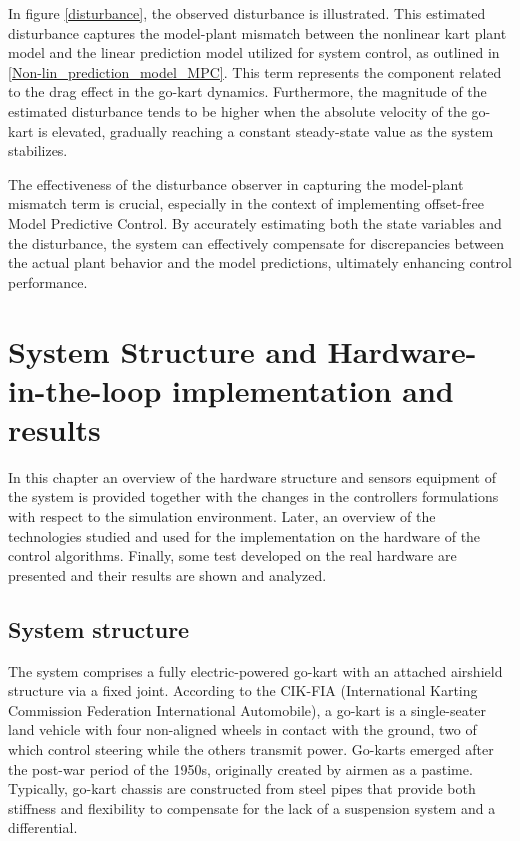 \documentclass[a4paper,12pt,oneside]{book}
\begin{document}
In figure \ref{disturbance}, the observed disturbance is illustrated. 
This estimated disturbance captures the model-plant mismatch between the nonlinear kart plant model and the linear prediction model utilized for system control, as outlined in \eqref{Non-lin_prediction_model_MPC}.
This term represents the component related to the drag effect in the go-kart dynamics.
Furthermore, the magnitude of the estimated disturbance tends to be higher when the absolute velocity of the go-kart is elevated, gradually reaching a constant steady-state value as the system stabilizes.

The effectiveness of the disturbance observer in capturing the model-plant mismatch term is crucial, especially in the context of implementing offset-free Model Predictive Control. 
By accurately estimating both the state variables and the disturbance, the system can effectively compensate for discrepancies between the actual plant behavior and the model predictions, ultimately enhancing control performance.

 \chapter{System Structure and Hardware-in-the-loop implementation and results}
In this chapter an overview of the hardware structure and sensors equipment of the system is provided together with the changes in the controllers formulations with respect to the simulation environment. 
Later, an overview of the technologies studied and used for the implementation on the hardware of the control algorithms.
Finally, some test developed on the real hardware are presented and their results are shown and analyzed.

\section{System structure}

The system comprises a fully electric-powered go-kart with an attached airshield structure via a fixed joint. 
According to the CIK-FIA (International Karting Commission Federation International Automobile), a go-kart is a single-seater land vehicle with four non-aligned wheels in contact with the ground, two of which control steering while the others transmit power. 
Go-karts emerged after the post-war period of the 1950s, originally created by airmen as a pastime.
Typically, go-kart chassis are constructed from steel pipes that provide both stiffness and flexibility to compensate for the lack of a suspension system and a differential.
\end{document}
